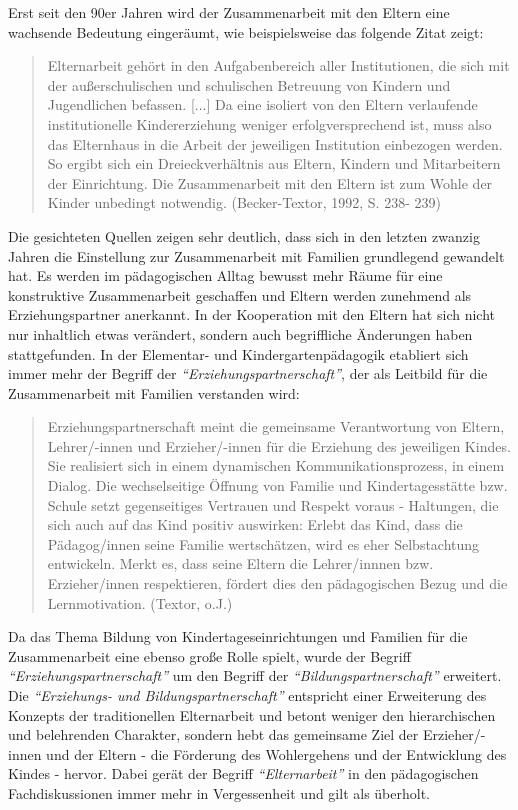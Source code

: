 \documentclass[12pt,a4paper]{article}
\begin{document}
	Erst seit den 90er Jahren wird der Zusammenarbeit mit den Eltern eine wachsende Bedeutung eingeräumt, wie beispielsweise das folgende Zitat zeigt:	
\begin{quote}

 Elternarbeit gehört in den Aufgabenbereich aller Institutionen, die 	sich mit der	außerschulischen und schulischen Betreuung von 	Kindern und Jugendlichen  befassen. [...] Da eine isoliert von den 	Eltern verlaufende institutionelle Kindererziehung weniger 	erfolgversprechend ist, muss also das Elternhaus in die Arbeit 	der jeweiligen Institution einbezogen werden. So ergibt sich ein 	Dreieckverhältnis aus Eltern, Kindern und Mitarbeitern der 	Einrichtung. Die Zusammenarbeit mit den Eltern ist zum Wohle 	der Kinder unbedingt notwendig. (Becker-Textor, 1992, S. 238-	239)
	\end{quote}
	Die gesichteten Quellen zeigen sehr deutlich, dass sich in den letzten zwanzig Jahren die Einstellung zur Zusammenarbeit mit Familien grundlegend gewandelt hat. Es werden im pädagogischen Alltag bewusst mehr Räume für eine konstruktive Zusammenarbeit geschaffen und Eltern werden zunehmend als Erziehungspartner anerkannt. In der Kooperation mit den Eltern hat sich nicht nur inhaltlich etwas verändert, sondern auch begriffliche Änderungen haben stattgefunden. In der Elementar- und Kindergartenpädagogik etabliert sich immer mehr der Begriff der \textit{"`Erziehungspartnerschaft"'}, der als Leitbild für die Zusammenarbeit mit Familien verstanden wird:
\begin{quote}
Erziehungspartnerschaft meint die gemeinsame Verantwortung von Eltern, Lehrer/-innen und Erzieher/-innen für die Erziehung des jeweiligen Kindes. Sie realisiert sich in einem dynamischen Kommunikationsprozess, in einem Dialog. Die wechselseitige Öffnung von Familie und Kindertagesstätte bzw. Schule setzt gegenseitiges Vertrauen und Respekt voraus - Haltungen, die sich auch auf das Kind positiv auswirken: Erlebt das Kind, dass die Pädagog/innen seine Familie wertschätzen, wird es eher Selbstachtung entwickeln. Merkt es, dass seine Eltern die Lehrer/innnen bzw. Erzieher/innen respektieren, fördert dies den pädagogischen Bezug und die Lernmotivation. (Textor, o.J.) 
	\end{quote}
	
	Da das Thema Bildung von Kindertageseinrichtungen und Familien für die Zusammenarbeit eine ebenso große Rolle spielt, wurde der Begriff \textit{"`Erziehungspartnerschaft"'} um den Begriff der \textit{"`Bildungspartnerschaft"'} erweitert. Die \textit{"`Erzie\-hungs- und Bildungspartnerschaft"'} entspricht einer Erweiterung des Konzepts der traditionellen Elternarbeit und betont weniger den hierarchischen und belehrenden Charakter, sondern hebt das gemeinsame Ziel  der Erzieher/-innen und der Eltern - die Förderung des Wohlergehens und der Entwicklung des Kindes - hervor. Dabei gerät der Begriff \textit{"`Elternarbeit"'} in den pädagogischen Fachdiskussionen immer mehr in Vergessenheit und gilt als überholt.
	
\end{document}
